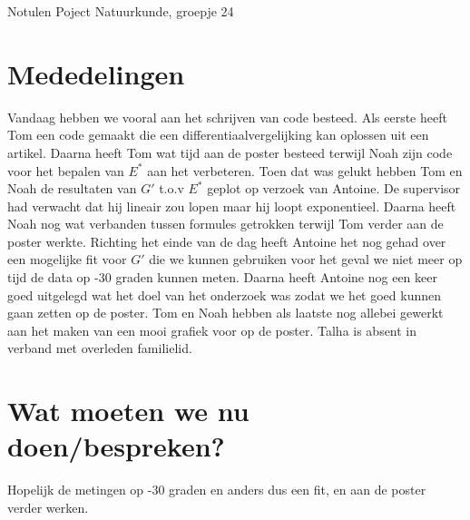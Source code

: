 \documentclass[11pt,a4paper]{article}
\begin{document}
\begin{Minutes}{Notulen Poject Natuurkunde, groepje 24}


\endtime{}
\location{}




\maketitle



\newpage


\section{Mededelingen} 
Vandaag hebben we vooral aan het schrijven van code besteed. Als eerste heeft Tom een code gemaakt die een differentiaalvergelijking kan oplossen uit een artikel. Daarna heeft Tom wat tijd aan de poster besteed terwijl Noah zijn code voor het bepalen van $E^*$ aan het verbeteren. Toen dat was gelukt hebben Tom en Noah de resultaten van $G'$ t.o.v $E^*$ geplot op verzoek van Antoine. De supervisor had verwacht dat hij lineair zou lopen maar hij loopt exponentieel. Daarna heeft Noah nog wat verbanden tussen formules getrokken terwijl Tom verder aan de poster werkte. Richting het einde van de dag heeft Antoine het nog gehad over een mogelijke fit voor $G'$ die we kunnen gebruiken voor het geval we niet meer op tijd de data op -30 graden kunnen meten. Daarna heeft Antoine nog een keer goed uitgelegd wat het doel van het onderzoek was zodat we het goed kunnen gaan zetten op de poster. Tom en Noah hebben als laatste nog allebei gewerkt aan het maken van een mooi grafiek voor op de poster. Talha is absent in verband met overleden familielid. 


\section{Wat moeten we nu doen/bespreken?}
Hopelijk de metingen op -30 graden en anders dus een fit, en aan de poster verder werken.


\end{Minutes}
\end{document}

